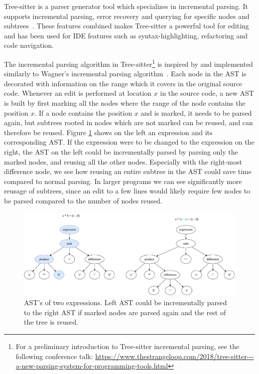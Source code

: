 Tree-sitter is a parser generator tool which specializes in incremental parsing. It
supports incremental parsing, error recovery and querying for specific nodes and
subtrees~\cite{treesitter}. These features combined makes Tree-sitter a powerful tool for
editing and has been used for IDE features such as syntax-highlighting, refactoring and
code navigation.

The incremental parsing algorithm in Tree-sitter\footnote{For a preliminary introduction
to Tree-sitter incremental parsing, see the following conference talk:
\url{https://www.thestrangeloop.com/2018/tree-sitter---a-new-parsing-system-for-programming-tools.html}}
is inspired by and implemented similarly to Wagner's incremental parsing
algorithm~\cite{PracticalAlgorithmsForIncremental}. Each node in the AST is decorated with
information on the range which it covers in the original source code. Whenever an edit is
performed at location $x$ in the source code, a new AST is built by first marking all the
nodes where the range of the node contains the position $x$. If a node contains the
position $x$ and is marked, it needs to be parsed again, but subtrees rooted in nodes
which are not marked can be reused, and can therefore be reused. Figure
\ref{fig:incrementalparsing} shows on the left an expression and its corresponding AST. If
the expression were to be changed to the expression on the right, the AST on the left
could be incrementally parsed by parsing only the marked nodes, and reusing all the other
nodes. Especially with the right-most difference node, we see how reusing an entire
subtree in the AST could save time compared to normal parsing. In larger programs we can
see significantly more reusage of subtrees, since an edit to a few lines would likely
require few nodes to be parsed compared to the number of nodes reused.

\begin{figure}[t]
    \begin{center}
        \includegraphics[width=1\textwidth]{figures/incrementalparsing.drawio.pdf}
    \end{center}
    \caption{AST's of two expressions. Left AST could be incrementally parsed to
        the right AST if marked nodes are parsed again and the rest of the tree is reused.}
    \label{fig:incrementalparsing}
\end{figure}



